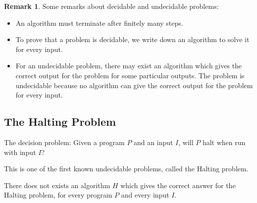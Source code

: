 \documentclass[11pt]{article}
\theoremstyle{definition}
\newtheorem{remark}[thm]{Remark}
\begin{document}
\begin{remark} Some remarks about decidable and undecidable problems:\vspace{-1.5ex}
\begin{itemize}
    \item An algorithm must terminate after finitely many steps.
    \item To prove that a problem is decidable, we write down an algorithm to solve it for every input.
    \item For an undecidable problem, there may exist an algorithm which gives the correct output for the problem for some particular outputs. The problem is undecidable because no algorithm can give the correct output for the problem for every input.
\end{itemize}
\end{remark}

\subsection{The Halting Problem}
The decision problem: Given a program $P$ and an input $I$, will $P$ halt when run with input $I$?

This is one of the first known undecidable problems, called the Halting problem.

There does not exists an algorithm $H$ which gives the correct answer for the Halting problem, for every program $P$ and every input $I$.
\end{document}
